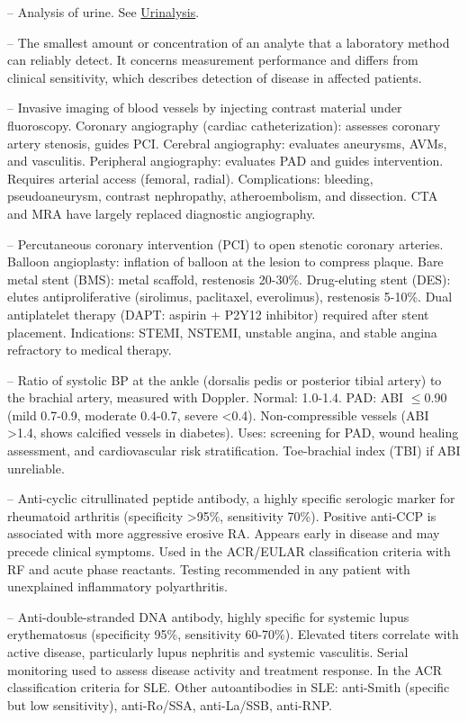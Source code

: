 -- Analysis of urine. See \hyperlink{Urinalysis}{Urinalysis}.

-- The smallest amount or concentration of an analyte that a laboratory method can reliably detect. It concerns measurement performance and differs from clinical sensitivity, which describes detection of disease in affected patients.

-- Invasive imaging of blood vessels by injecting contrast material under fluoroscopy. Coronary angiography (cardiac catheterization): assesses coronary artery stenosis, guides PCI. Cerebral angiography: evaluates aneurysms, AVMs, and vasculitis. Peripheral angiography: evaluates PAD and guides intervention. Requires arterial access (femoral, radial). Complications: bleeding, pseudoaneurysm, contrast nephropathy, atheroembolism, and dissection. CTA and MRA have largely replaced diagnostic angiography.

-- Percutaneous coronary intervention (PCI) to open stenotic coronary arteries. Balloon angioplasty: inflation of balloon at the lesion to compress plaque. Bare metal stent (BMS): metal scaffold, restenosis 20-30\%. Drug-eluting stent (DES): elutes antiproliferative (sirolimus, paclitaxel, everolimus), restenosis 5-10\%. Dual antiplatelet therapy (DAPT: aspirin + P2Y12 inhibitor) required after stent placement. Indications: STEMI, NSTEMI, unstable angina, and stable angina refractory to medical therapy.

-- Ratio of systolic BP at the ankle (dorsalis pedis or posterior tibial artery) to the brachial artery, measured with Doppler. Normal: 1.0-1.4. PAD: ABI \(\le\)0.90 (mild 0.7-0.9, moderate 0.4-0.7, severe <0.4). Non-compressible vessels (ABI >1.4, shows calcified vessels in diabetes). Uses: screening for PAD, wound healing assessment, and cardiovascular risk stratification. Toe-brachial index (TBI) if ABI unreliable.

-- Anti-cyclic citrullinated peptide antibody, a highly specific serologic marker for rheumatoid arthritis (specificity >95\%, sensitivity 70\%). Positive anti-CCP is associated with more aggressive erosive RA. Appears early in disease and may precede clinical symptoms. Used in the ACR/EULAR classification criteria with RF and acute phase reactants. Testing recommended in any patient with unexplained inflammatory polyarthritis.

-- Anti-double-stranded DNA antibody, highly specific for systemic lupus erythematosus (specificity 95\%, sensitivity 60-70\%). Elevated titers correlate with active disease, particularly lupus nephritis and systemic vasculitis. Serial monitoring used to assess disease activity and treatment response. In the ACR classification criteria for SLE. Other autoantibodies in SLE: anti-Smith (specific but low sensitivity), anti-Ro/SSA, anti-La/SSB, anti-RNP.

